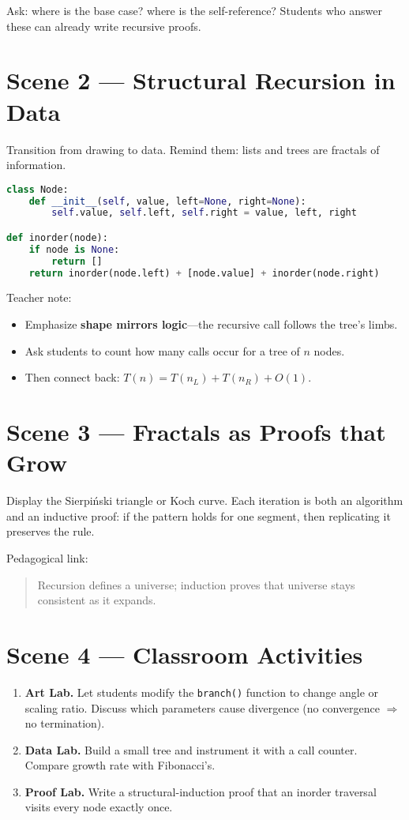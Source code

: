 Ask: where is the base case? where is the self-reference?
Students who answer these can already write recursive proofs.

\section{Scene 2 — Structural Recursion in Data}
Transition from drawing to data.  
Remind them: lists and trees are fractals of information.

\begin{lstlisting}[language=Python,caption={Recursive traversal of a binary tree}]
class Node:
    def __init__(self, value, left=None, right=None):
        self.value, self.left, self.right = value, left, right

def inorder(node):
    if node is None: 
        return []
    return inorder(node.left) + [node.value] + inorder(node.right)
\end{lstlisting}

Teacher note:
\begin{itemize}
  \item Emphasize \textbf{shape mirrors logic}—the recursive call follows the tree’s limbs.
  \item Ask students to count how many calls occur for a tree of $n$ nodes.
  \item Then connect back: $T(n)=T(n_L)+T(n_R)+O(1)$.
\end{itemize}

\section{Scene 3 — Fractals as Proofs that Grow}
Display the Sierpiński triangle or Koch curve.
Each iteration is both an algorithm and an inductive proof:
if the pattern holds for one segment, then replicating it preserves the rule.

Pedagogical link:
\begin{quote}
Recursion defines a universe; induction proves that universe stays consistent
as it expands.
\end{quote}

\section{Scene 4 — Classroom Activities}
\begin{enumerate}
  \item \textbf{Art Lab.} Let students modify the \texttt{branch()} function
        to change angle or scaling ratio.  
        Discuss which parameters cause divergence (no convergence $\Rightarrow$ no termination).
  \item \textbf{Data Lab.} Build a small tree and instrument it with a call counter.
        Compare growth rate with Fibonacci’s.
  \item \textbf{Proof Lab.} Write a structural-induction proof
        that an inorder traversal visits every node exactly once.
\end{enumerate}

